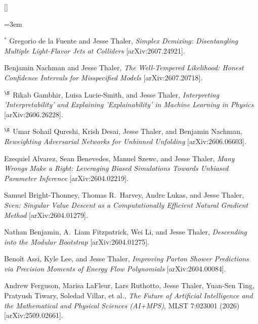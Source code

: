 \setcounter{jessecount}{74}

\begin{list}{[]\addtocounter{jessecount}{-1}}{\leftmargin=3em \itemsep=4pt}

\item
${}^\ast$ Gregorio de la Fuente and Jesse Thaler,
\emph{Simplex Demixing: Disentangling Multiple Light-Flavor Jets at Colliders}
[arXiv:2607.24921].

\item
 Benjamin Nachman and Jesse Thaler,
\emph{The Well-Tempered Likelihood: Honest Confidence Intervals for Misspecified Models}
[arXiv:2607.20718].

\item
${}^\S$ Rikab Gambhir, Luisa Lucie-Smith, and Jesse Thaler,
\emph{Interpreting 'Interpretability' and Explaining 'Explainability' in Machine Learning in Physics}
[arXiv:2606.26228].

\item
${}^\S$ Umar Sohail Qureshi, Krish Desai, Jesse Thaler, and Benjamin Nachman,
\emph{Reweighting Adversarial Networks for Unbinned Unfolding}
[arXiv:2606.06603].

\item
 Ezequiel Alvarez, Sean Benevedes, Manuel Szewc, and Jesse Thaler,
\emph{Many Wrongs Make a Right: Leveraging Biased Simulations Towards Unbiased Parameter Inference}
[arXiv:2604.02219].

\item
 Samuel Bright-Thonney, Thomas R.\ Harvey, Andre Lukas, and Jesse Thaler,
\emph{Sven: Singular Value Descent as a Computationally Efficient Natural Gradient Method}
[arXiv:2604.01279].

\item
 Nathan Benjamin, A.\ Liam Fitzpatrick, Wei Li, and Jesse Thaler,
\emph{Descending into the Modular Bootstrap}
[arXiv:2604.01275].

\item
 Benoît Assi, Kyle Lee, and Jesse Thaler,
\emph{Improving Parton Shower Predictions via Precision Moments of Energy Flow Polynomials}
[arXiv:2604.00084].

\item
 Andrew Ferguson, Marisa LaFleur, Lars Ruthotto, Jesse Thaler, Yuan-Sen Ting, Pratyush Tiwary, Soledad Villar, et al.,
\emph{The Future of Artificial Intelligence and the Mathematical and Physical Sciences (AI+MPS)},
MLST 7:023001 (2026)
[arXiv:2509.02661].


\end{list}
